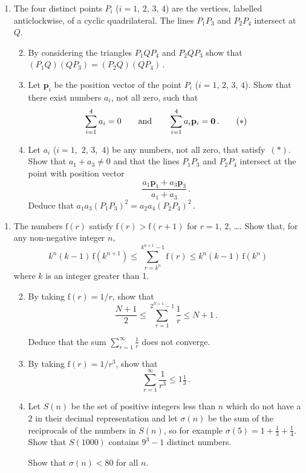 \documentclass[a4, 11pt]{report}
\newlength{\qspace}
\newcounter{qnumber}
\newenvironment{question}%
 {\vspace{\qspace}
  \begin{enumerate}[\bfseries 1\quad][10]%
    \setcounter{enumi}{\value{qnumber}}%
    \item%
 }
{
  \end{enumerate}
  \filbreak
  \stepcounter{qnumber}
 }
\newenvironment{questionparts}[1][1]%
 {
  \begin{enumerate}[\bfseries (i)]%
    \setcounter{enumii}{#1}
    \addtocounter{enumii}{-1}
    \setlength{\itemsep}{5mm}
    \setlength{\parskip}{8pt}
 }
 {
  \end{enumerate}
 }
\def\le{\leqslant}
\renewcommand{\.}[1]{\ensuremath{\mathrm{#1}}}
\newcommand{\+}[1]{\ensuremath{\mathbf{#1}}}
\begin{document}
\begin{question}
The four distinct points $P_i$ ($i=1$, $2$, $3$, $4$) are the
    vertices, labelled anticlockwise, of a cyclic quadrilateral.  The
    lines $P_1P_3$ and $P_2P_4$ intersect at $Q$. 

  \begin{questionparts}
  \item 
By considering the
    triangles $P_1QP_4$ and $P_2QP_3$ show that
    $(P_1Q)( QP_3) = (P_2Q) (QP_4)\,$.
  \item Let $\+p_i$ be the position vector of the point $P_i$
 ($i=1$, $2$, $3$, $4$). Show that there
    exist numbers $a_i$, not all zero, such
    that
    \begin{equation}
      \sum\limits_{i=1}^4 a_i =0 \qquad\text{and}\qquad
      \sum\limits_{i=1}^4 a_i \+p_i ={\bf 0} \,. \tag{$*$}
    \end{equation}
  \item Let $a_i$ ($i=1$,~$2$, $3$,~$4$) be any numbers, not all zero,
   that  satisfy~$(*)$.  Show that $a_1+a_3\ne 0$ and that the lines
    $P_1P_3$ and $P_2P_4$ intersect at the point with position vector
    \[
    \frac{a_1 \+p_1 + a_3 \+p_3}{a_1+a_3} \,.
    \]
    Deduce that $a_1a_3 (P_1P_3)^2 = a_2a_4 (P_2P_4)^2\,$.
  \end{questionparts}
\end{question}
		
\begin{question}
  The numbers $\.f(r)$ satisfy $\.f(r)>\.f(r+1)$ for $r=1$, $2$,
  \dots.  Show that, for any non-negative integer $n$,
  \[
  k^n(k-1) \, \.f(k^{n+1}) \le \sum_{r=k^n}^{k^{n+1}-1}\.f(r) \le k^n(k-1)\,
  \.f(k^n)\,
  \]
where $k$ is an integer greater than 1.

  \begin{questionparts}
  \item By taking $\.f(r) = 1/r$, show that
    \[
    \frac{N+1}2 \le \sum_{r=1}^{2^{N+1}-1} \frac1r \le N+1 \,.
    \]

    Deduce that the sum $\sum\limits_{r=1}^\infty \frac1r$ does not
    converge.
  \item By taking $\.f(r)= 1/r^3$, show that
    \[
    \sum_{r=1}^\infty \frac1 {r^3} \le  1 \tfrac 13 \,.
    \]

  \item Let $S(n)$ be the set of positive integers less than $n$ which
    do not have a $2$ in their decimal representation and let
    $\sigma(n)$ be the sum of the reciprocals of the numbers in
    $S(n)$, so for example $\sigma(5) = 1+\frac13+\frac14$. Show that
    $S(1000)$ contains $9^3-1$ distinct numbers.

    Show  that $\sigma (n) < 80$ for all $n$.
  \end{questionparts}
\end{question}	
		
\end{document}
